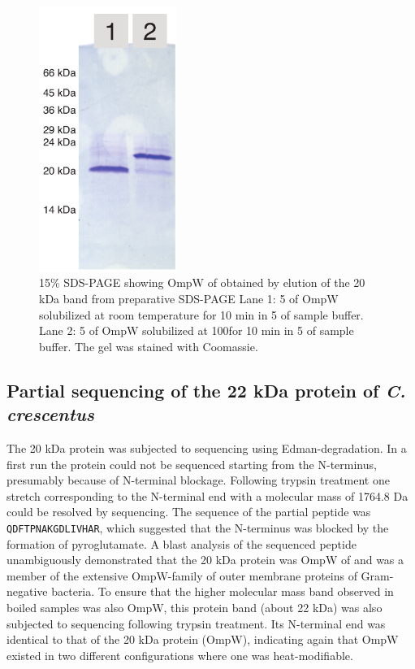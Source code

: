 \begin{figure}[htb]
  	\begin{center}
   		\includegraphics[width=0.4\textwidth]{porin_chapter/img/Fig3-gelpurif.pdf}
   	\end{center}
   	\caption[\ac{SDS-PAGE} showing OmpW from \caulobacter obtained by elution of the 20 kDa band]{
15\% \ac{SDS-PAGE} showing OmpW of \caulobacter obtained by elution of the 20 kDa band from preparative \ac{SDS-PAGE} Lane 1: 5 \microgram of OmpW solubilized at room temperature for 10 min in 5 \microlitre of sample buffer. Lane 2: 5 \microgram of OmpW solubilized at 100\cel for 10 min in 5 \microlitre of sample buffer. The gel was stained with Coomassie.
   	}
   	\label{fig:porin-elutedband}
\end{figure}   

\subsection{Partial sequencing of the 22 kDa protein of \textit{C. crescentus}}
The 20 kDa protein was subjected to sequencing using Edman-degradation. In a first run the protein could not be sequenced starting from the N-terminus, presumably because of N-terminal blockage. Following trypsin treatment one stretch corresponding to the N-terminal end with a molecular mass of 1764.8 Da could be resolved by sequencing. The sequence of the partial peptide was \texttt{QDFTPNAKGDLIVHAR}, which suggested that the N-terminus was blocked by the formation of pyroglutamate. A \ac{blast} analysis of the sequenced peptide unambiguously demonstrated that the 20 kDa protein was OmpW of \caulobacter and was a member of the extensive OmpW-family of outer membrane proteins of Gram-negative bacteria. To ensure that the higher molecular mass band observed in boiled samples was also OmpW, this protein band (about 22 kDa) was also subjected to sequencing following trypsin treatment. Its N-terminal end was identical to that of the 20 kDa protein (OmpW), indicating again that OmpW existed in two different configurations where one was heat-modifiable. 

